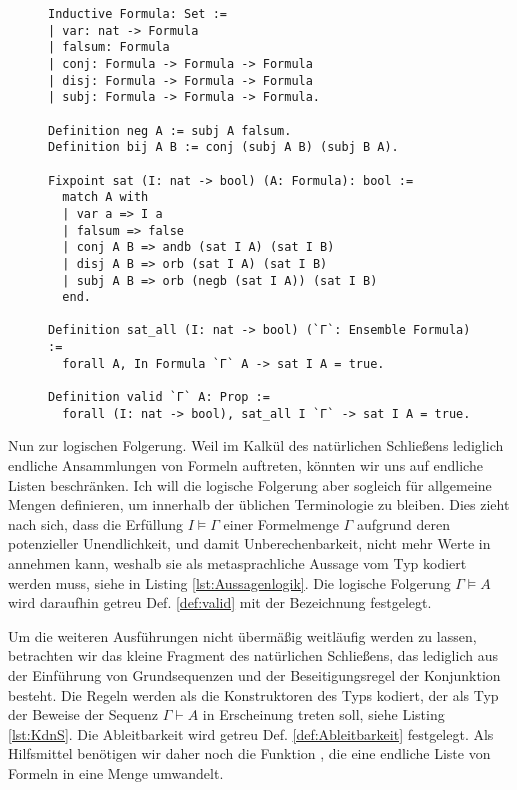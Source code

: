 \begin{figure}[t]
\begin{lstlisting}[language=Coq, xleftmargin=\mathindent, escapechar=`,
label=lst:Aussagenlogik, caption={Die aussagenlogische Sprache und ihre
klassische Semantik}]
Inductive Formula: Set :=
| var: nat -> Formula
| falsum: Formula
| conj: Formula -> Formula -> Formula
| disj: Formula -> Formula -> Formula
| subj: Formula -> Formula -> Formula.

Definition neg A := subj A falsum.
Definition bij A B := conj (subj A B) (subj B A).

Fixpoint sat (I: nat -> bool) (A: Formula): bool :=
  match A with
  | var a => I a
  | falsum => false
  | conj A B => andb (sat I A) (sat I B)
  | disj A B => orb (sat I A) (sat I B)
  | subj A B => orb (negb (sat I A)) (sat I B)
  end.

Definition sat_all (I: nat -> bool) (`Γ`: Ensemble Formula) :=
  forall A, In Formula `Γ` A -> sat I A = true.

Definition valid `Γ` A: Prop :=
  forall (I: nat -> bool), sat_all I `Γ` -> sat I A = true.
\end{lstlisting}
\end{figure}

Nun zur logischen Folgerung. Weil im Kalkül des natürlichen Schließens
lediglich endliche Ansammlungen von Formeln auftreten, könnten wir uns
auf endliche Listen beschränken. Ich will die logische Folgerung aber
sogleich für allgemeine Mengen definieren,
um innerhalb der üblichen Terminologie zu bleiben. Dies zieht nach
sich, dass die Erfüllung $I\models\Gamma$ einer Formelmenge $\Gamma$ aufgrund
deren potenzieller Unendlichkeit, und damit Unberechenbarkeit, nicht
mehr Werte in  annehmen kann, weshalb sie als metasprachliche
Aussage vom Typ  kodiert werden muss, siehe
 in Listing \ref{lst:Aussagenlogik}.
Die logische Folgerung $\Gamma\models A$ wird daraufhin getreu
Def. \ref{def:valid} mit der Bezeichnung  festgelegt.

Um die weiteren Ausführungen nicht übermäßig weitläufig werden zu lassen,
betrachten wir das kleine Fragment des natürlichen Schließens, das lediglich
aus der Einführung von Grundsequenzen und der Beseitigungsregel der
Konjunktion besteht. Die Regeln werden als die Konstruktoren des Typs
 kodiert, der als Typ der Beweise der Sequenz
$\Gamma\vdash A$ in Erscheinung treten soll, siehe Listing \ref{lst:KdnS}.
Die Ableitbarkeit  wird getreu Def. \ref{def:Ableitbarkeit}
festgelegt. Als Hilfsmittel benötigen wir daher noch die Funktion
, die eine endliche Liste von Formeln in eine Menge umwandelt.

